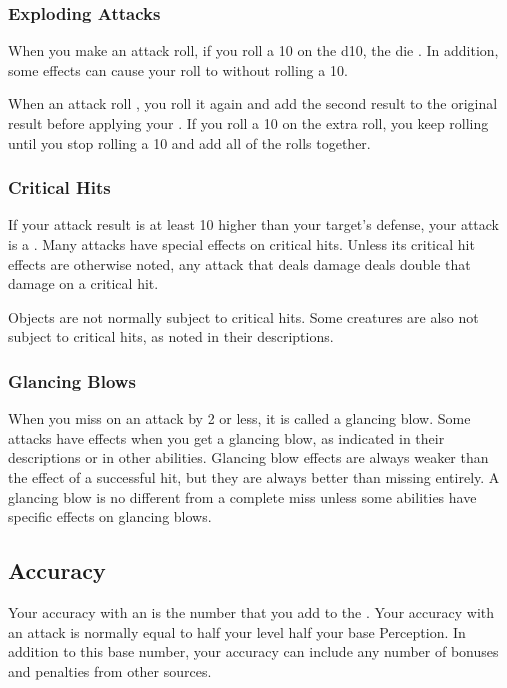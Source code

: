         \subsubsection{Exploding Attacks}\label{Exploding Attacks}
            When you make an attack roll, if you roll a 10 on the d10, the die .
            In addition, some effects can cause your roll to  without rolling a 10.

            When an attack roll , you roll it again and add the second result to the original result before applying your .
            If you roll a 10 on the extra roll, you keep rolling until you stop rolling a 10 and add all of the rolls together.

        \subsubsection{Critical Hits}\label{Critical Hits}
            If your attack result is at least 10 higher than your target's defense, your attack is a .
            Many attacks have special effects on critical hits.
            Unless its critical hit effects are otherwise noted, any attack that deals damage deals double that damage on a critical hit.

            Objects are not normally subject to critical hits.
            Some creatures are also not subject to critical hits, as noted in their descriptions.

        \subsubsection{Glancing Blows}\label{Glancing Blows}
            When you miss on an attack by 2 or less, it is called a glancing blow.
            Some attacks have effects when you get a glancing blow, as indicated in their descriptions or in other abilities.
            Glancing blow effects are always weaker than the effect of a successful hit, but they are always better than missing entirely.
            A glancing blow is no different from a complete miss unless some abilities have specific effects on glancing blows.

    \subsection{Accuracy}\label{Accuracy}
        Your accuracy with an  is the number that you add to the .
        Your accuracy with an attack is normally equal to half your level \add half your base Perception.
        In addition to this base number, your accuracy can include any number of bonuses and penalties from other sources.

